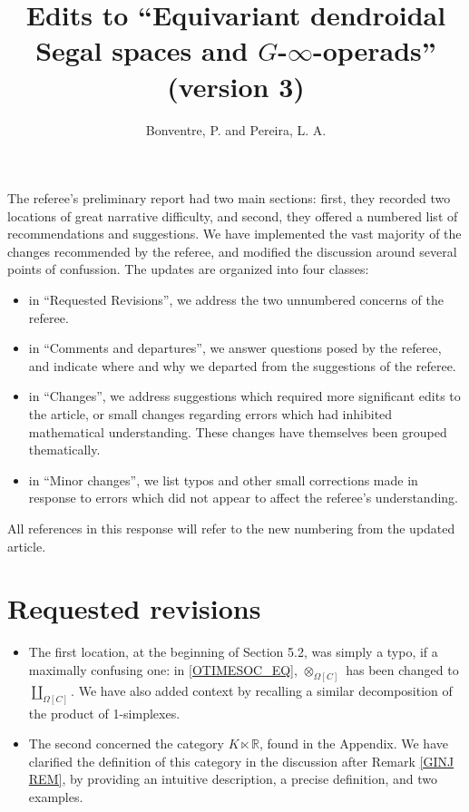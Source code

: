 \documentclass{article}
\begin{document}
 
 
\title{Edits to ``Equivariant dendroidal Segal spaces and $G$-$\infty$-operads'' (version 3)
\\[12pt]} %
 
\author{Bonventre, P. and Pereira, L. A.}
 
\maketitle
 
The referee's preliminary report had two main sections:
first, they recorded two locations of great narrative difficulty,
and second, they offered a numbered list of recommendations and suggestions.
We have implemented the vast majority of the changes recommended by the referee, and modified the discussion around several points of confussion.
The updates are organized into four classes:
\begin{itemize}
\item in ``Requested Revisions'', we address the two unnumbered concerns of the referee.
\item in ``Comments and departures'', we answer questions posed by the referee, and indicate where and why we departed from the suggestions of the referee.
\item in ``Changes'', we address suggestions which required more significant edits to the article, or small changes regarding errors which had inhibited mathematical understanding. These changes have themselves been grouped thematically.
\item in ``Minor changes'', we list typos and other small corrections made in response to errors which did not appear to affect the referee's understanding.
\end{itemize}

All references in this response will refer to the new numbering from the updated article.


\section{Requested revisions}


\begin{itemize}
\item The first location, at the beginning of Section 5.2, was simply a typo, if a maximally confusing one:
      in \eqref{OTIMESOC_EQ}, $\otimes_{\Omega[C]}$ has been changed to $\coprod_{\Omega[C]}$.
      We have also added context by recalling a similar decomposition of the product of 1-simplexes.

\item The second concerned the category $K \ltimes \mathbb R$, found in the Appendix.
      We have clarified the definition of this category in the discussion after Remark \ref{GINJ REM},
      by providing an intuitive description, a precise definition, and two examples.
\end{itemize}
\end{document}
